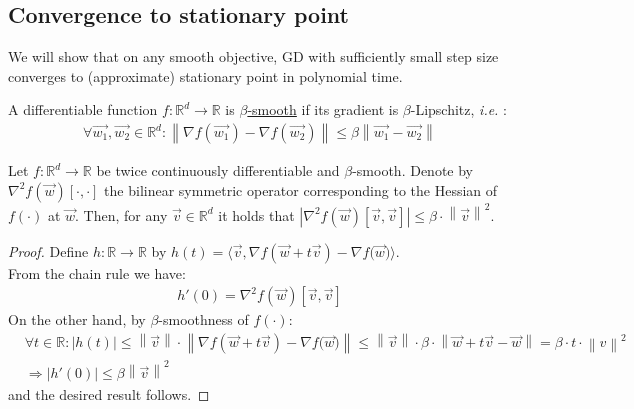 \documentclass[12pt]{article}
\newcommand{\norm}[1]{\left\| #1 \right\|}
\newcommand{\ie}{{\it i.e. }}
\begin{document}
    \subsection{Convergence to stationary point}
    We will show that on any smooth objective, GD with sufficiently small step size converges to (approximate) stationary point in polynomial time.
	\begin{definition}
	\label{def:beta smooth function}				
		A differentiable function $f:\mathbb{R}^d\to\mathbb{R}$ is \underline{$\beta$-smooth} if its gradient is $\beta$-Lipschitz, \ie:
		\begin{align*}
		    \forall\overrightarrow{w_1},\overrightarrow{w_2}\in\mathbb{R}^d:\norm{\nabla{f(\overrightarrow{w_1})}-\nabla{f(\overrightarrow{w_2})}}\leq \beta \norm{\overrightarrow{w_1}-\overrightarrow{w_2}}
	    \end{align*}
	\end{definition}
	\begin{lemma}
	\label{lem:twice continuously differentiable beta-smooth functions property 1}
		Let $f:\mathbb{R}^d\to\mathbb{R}$ be twice continuously differentiable and $\beta$-smooth. Denote by $\nabla^2f(\overrightarrow{w})[\cdot,\cdot]$ the bilinear symmetric operator corresponding to the Hessian of $f(\cdot)$ at $\overrightarrow{w}$. Then, for any $\overrightarrow{v}\in\mathbb{R}^d$ it holds that $|\nabla^2f(\overrightarrow{w})[\overrightarrow{v},\overrightarrow{v}]|\leq\beta\cdot\norm{\overrightarrow{v}}^2$.
	\end{lemma}
	\begin{proof}
	    Define $h:\mathbb{R}\to\mathbb{R}$ by $h(t)=\langle\overrightarrow{v},\nabla{f(\overrightarrow{w}+t\overrightarrow{v})}-\nabla{f(\overrightarrow{w}})\rangle$.
	    \\From the chain rule we have:
		\begin{align*}
		    h'(0) = \nabla^2f(\overrightarrow{w})[\overrightarrow{v},\overrightarrow{v}]
	    \end{align*}
	    On the other hand, by $\beta$-smoothness of $f(\cdot)$:
		\begin{align*}
		    & \forall t\in\mathbb{R}: |h(t)| \leq \norm{\overrightarrow{v}}\cdot\norm{\nabla{f(\overrightarrow{w}+t\overrightarrow{v})}-\nabla{f(\overrightarrow{w}})} \leq \norm{\overrightarrow{v}} \cdot \beta \cdot \norm{\overrightarrow{w}+t\overrightarrow{v} - \overrightarrow{w}} = \beta \cdot t \cdot \norm{v}^2\\
		    & \Longrightarrow |h'(0)| \leq \beta \norm{\overrightarrow{v}}^2
	    \end{align*}
	    and the desired result follows.
	\end{proof}
\end{document}
